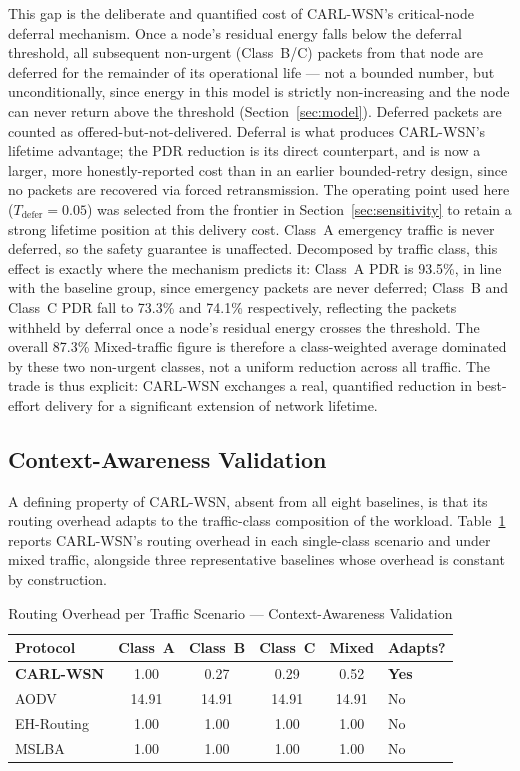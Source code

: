 \documentclass[12pt]{article}
\begin{document}
This gap is the deliberate and quantified cost of CARL-WSN's
critical-node deferral mechanism. Once a node's residual energy
falls below the deferral threshold, all subsequent non-urgent
(Class~B/C) packets from that node are deferred for the remainder of
its operational life --- not a bounded number, but unconditionally,
since energy in this model is strictly non-increasing and the node
can never return above the threshold (Section~\ref{sec:model}).
Deferred packets are counted as offered-but-not-delivered. Deferral
is what produces CARL-WSN's lifetime advantage; the PDR reduction is
its direct counterpart, and is now a larger, more honestly-reported
cost than in an earlier bounded-retry design, since no packets are
recovered via forced retransmission. The operating point used here
($T_{\mathrm{defer}} = 0.05$) was selected from the frontier in
Section~\ref{sec:sensitivity} to retain a strong lifetime position at
this delivery cost. Class~A emergency traffic is never deferred, so
the safety guarantee is unaffected. Decomposed by traffic class, this
effect is exactly where the mechanism predicts it: Class~A PDR is
93.5\%, in line with the baseline group, since emergency packets are
never deferred; Class~B and Class~C PDR fall to 73.3\% and 74.1\%
respectively, reflecting the packets withheld by deferral once a
node's residual energy crosses the threshold. The overall 87.3\%
Mixed-traffic figure is therefore a class-weighted average dominated
by these two non-urgent classes, not a uniform reduction across all
traffic. The trade is thus explicit: CARL-WSN exchanges a real,
quantified reduction in best-effort delivery for a significant
extension of network lifetime.

\subsection{Context-Awareness Validation}

A defining property of CARL-WSN, absent from all eight baselines, is
that its routing overhead adapts to the traffic-class composition of
the workload. Table~\ref{tab:context} reports CARL-WSN's routing
overhead in each single-class scenario and under mixed traffic,
alongside three representative baselines whose overhead is constant
by construction.

\begin{table}[!t]
\renewcommand{\arraystretch}{1.2}
\caption{Routing Overhead per Traffic Scenario --- Context-Awareness Validation}
\label{tab:context}
\centering
\begin{tabular}{lccccl}
\hline
\textbf{Protocol} & \textbf{Class~A} & \textbf{Class~B} &
\textbf{Class~C} & \textbf{Mixed} & \textbf{Adapts?} \\
\hline
\textbf{CARL-WSN} & 1.00 & 0.27 & 0.29 & 0.52 & \textbf{Yes} \\
AODV              & 14.91 & 14.91 & 14.91 & 14.91 & No \\
EH-Routing        & 1.00 & 1.00 & 1.00 & 1.00 & No \\
MSLBA             & 1.00 & 1.00 & 1.00 & 1.00 & No \\
\hline
\end{tabular}
\end{table}
\end{document}
